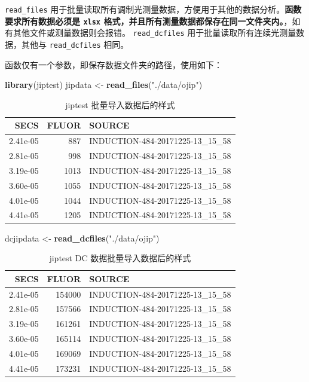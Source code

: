 \documentclass[
]{krantz}
\makeatletter
\newenvironment{Shaded}{\begin{snugshade}}{\end{snugshade}}
\newcommand{\KeywordTok}[1]{\textcolor[rgb]{0.13,0.29,0.53}{\textbf{#1}}}
\newcommand{\NormalTok}[1]{#1}
\newcommand{\StringTok}[1]{\textcolor[rgb]{0.31,0.60,0.02}{#1}}
\newenvironment{kframe}{%
\medskip{}
\setlength{\fboxsep}{.8em}
 \def\at@end@of@kframe{}%
 \ifinner\ifhmode%
  \def\at@end@of@kframe{\end{minipage}}%
  \begin{minipage}{\columnwidth}%
 \fi\fi%
 \def\FrameCommand##1{\hskip\@totalleftmargin \hskip-\fboxsep
 \colorbox{shadecolor}{##1}\hskip-\fboxsep
     \hskip-\linewidth \hskip-\@totalleftmargin \hskip\columnwidth}%
 \MakeFramed {\advance\hsize-\width
   \@totalleftmargin\z@ \linewidth\hsize
   \@setminipage}}%
 {\par\unskip\endMakeFramed%
 \at@end@of@kframe}
\renewenvironment{Shaded}{\begin{kframe}}{\end{kframe}}
\makeatother
\begin{document}
\texttt{read\_files} 用于批量读取所有调制光测量数据，方便用于其他的数据分析。\textbf{函数要求所有数据必须是 \texttt{xlsx} 格式，并且所有测量数据都保存在同一文件夹内。}，如有其他文件或测量数据则会报错。
\texttt{read\_dcfiles} 用于批量读取所有连续光测量数据，其他与 \texttt{read\_dcfiles} 相同。

函数仅有一个参数，即保存数据文件夹的路径，使用如下：

\begin{Shaded}
\begin{Highlighting}[]
\KeywordTok{library}\NormalTok{(jiptest)}
\NormalTok{jipdata \textless{}{-}}\StringTok{ }\KeywordTok{read\_files}\NormalTok{(}\StringTok{"./data/ojip"}\NormalTok{)}
\end{Highlighting}
\end{Shaded}

\begin{table}

\caption{\label{tab:unnamed-chunk-64}jiptest 批量导入数据后的样式}
\centering
\begin{tabular}[t]{rrl}
\toprule
SECS & FLUOR & SOURCE\\
\midrule
2.41e-05 & 887 & INDUCTION-484-20171225-13\_15\_58\\
2.81e-05 & 998 & INDUCTION-484-20171225-13\_15\_58\\
3.19e-05 & 1013 & INDUCTION-484-20171225-13\_15\_58\\
3.60e-05 & 1055 & INDUCTION-484-20171225-13\_15\_58\\
4.01e-05 & 1044 & INDUCTION-484-20171225-13\_15\_58\\
\addlinespace
4.41e-05 & 1205 & INDUCTION-484-20171225-13\_15\_58\\
\bottomrule
\end{tabular}
\end{table}

\begin{Shaded}
\begin{Highlighting}[]
\NormalTok{dcjipdata \textless{}{-}}\StringTok{ }\KeywordTok{read\_dcfiles}\NormalTok{(}\StringTok{"./data/ojip"}\NormalTok{)}
\end{Highlighting}
\end{Shaded}

\begin{table}

\caption{\label{tab:unnamed-chunk-65}jiptest DC 数据批量导入数据后的样式}
\centering
\begin{tabular}[t]{rrl}
\toprule
SECS & FLUOR & SOURCE\\
\midrule
2.41e-05 & 154000 & INDUCTION-484-20171225-13\_15\_58\\
2.81e-05 & 157566 & INDUCTION-484-20171225-13\_15\_58\\
3.19e-05 & 161261 & INDUCTION-484-20171225-13\_15\_58\\
3.60e-05 & 165114 & INDUCTION-484-20171225-13\_15\_58\\
4.01e-05 & 169069 & INDUCTION-484-20171225-13\_15\_58\\
\addlinespace
4.41e-05 & 173231 & INDUCTION-484-20171225-13\_15\_58\\
\bottomrule
\end{tabular}
\end{table}
\end{document}
